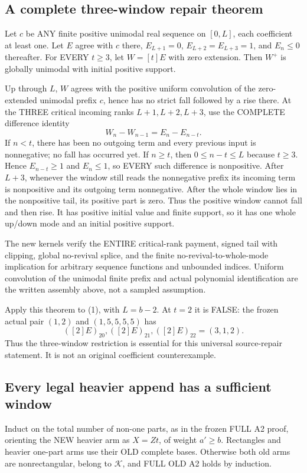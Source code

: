 \subsection{A complete three-window repair theorem}
Let $c$ be ANY finite positive unimodal real sequence on $[0,L]$,
each coefficient at least one. Let $E$ agree with $c$ there,
$E_{L+1}=0$, $E_{L+2}=E_{L+3}=1$, and $E_n\le0$ thereafter.
For EVERY $t\ge3$, let $W=[t]E$ with zero extension. Then
$W^+$ is globally unimodal with initial positive support.

Up through $L$, $W$ agrees with the positive uniform convolution
of the zero-extended unimodal prefix $c$, hence has no strict
fall followed by a rise there. At the THREE critical incoming
ranks $L+1,L+2,L+3$, use the COMPLETE difference identity
\[
                         W_n-W_{n-1}=E_n-E_{n-t}.       \tag{2}
\]
If $n<t$, there has been no outgoing term and every previous
input is nonnegative; no fall has occurred yet. If $n\ge t$,
then $0\le n-t\le L$ because $t\ge3$. Hence $E_{n-t}\ge1$
and $E_n\le1$, so EVERY such difference is nonpositive.
After $L+3$, whenever the window still reads the nonnegative
prefix its incoming term is nonpositive and its outgoing term
nonnegative. After the whole window lies in the nonpositive
tail, its positive part is zero. Thus the positive window cannot
fall and then rise. It has positive initial value and finite support,
so it has one whole up/down mode and an initial positive support.

The new kernels verify the ENTIRE critical-rank payment, signed
tail with clipping, global no-revival splice, and the finite
no-revival-to-whole-mode implication for arbitrary sequence
functions and unbounded indices. Uniform convolution of the
unimodal finite prefix and actual polynomial identification
are the written assembly above, not a sampled assumption.

Apply this theorem to (1), with $L=b-2$. At $t=2$ it is FALSE:
the frozen actual pair $(1,2)$ and $(1,5,5,5,5)$ has
\[
              ([2]E)_{20},([2]E)_{21},([2]E)_{22}=(3,1,2).
\]
Thus the three-window restriction is essential for this universal
source-repair statement. It is not an original coefficient counterexample.

\subsection{Every legal heavier append has a sufficient window}
Induct on the total number of non-one parts, as in the frozen
FULL A2 proof, orienting the NEW heavier arm as $X=Zt$, of
weight $a'\ge b$. Rectangles and heavier one-part arms use their
OLD complete bases. Otherwise both old arms are nonrectangular,
belong to $\mathcal K$, and FULL OLD A2 holds by induction.

